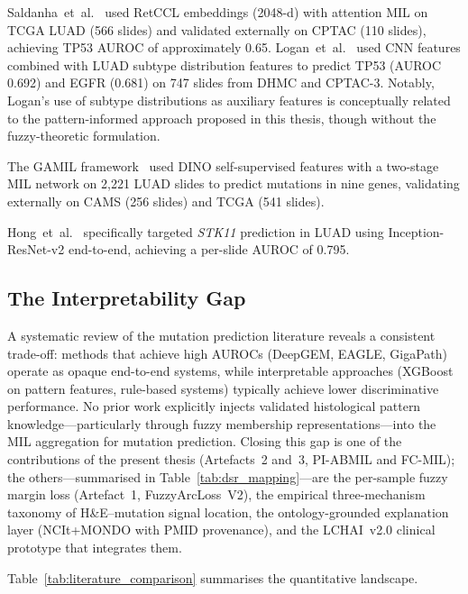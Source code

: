 Saldanha~et~al.~\cite{saldanha2023npj} used RetCCL embeddings (2048-d) with attention MIL on TCGA LUAD (566 slides) and validated externally on CPTAC (110 slides), achieving TP53 AUROC of approximately 0.65.
Logan~et~al.~\cite{logan2022medrxiv} used CNN features combined with LUAD subtype distribution features to predict TP53 (AUROC 0.692) and EGFR (0.681) on 747 slides from DHMC and CPTAC-3.
Notably, Logan's use of subtype distributions as auxiliary features is conceptually related to the pattern-informed approach proposed in this thesis, though without the fuzzy-theoretic formulation.

The GAMIL framework~\cite{gamil2025diagpath} used DINO self-supervised features with a two-stage MIL network on 2,221 LUAD slides to predict mutations in nine genes, validating externally on CAMS (256 slides) and TCGA (541 slides).

Hong~et~al.~\cite{hong2022stk11biomedinf} specifically targeted \textit{STK11} prediction in LUAD using Inception-ResNet-v2 end-to-end, achieving a per-slide AUROC of 0.795.

\subsection{The Interpretability Gap}
\label{sec:bg:related:gap}

A systematic review of the mutation prediction literature reveals a consistent trade-off: methods that achieve high AUROCs (DeepGEM, EAGLE, GigaPath) operate as opaque end-to-end systems, while interpretable approaches (XGBoost on pattern features, rule-based systems) typically achieve lower discriminative performance.
No prior work explicitly injects validated histological pattern knowledge---particularly through fuzzy membership representations---into the MIL aggregation for mutation prediction.
Closing this gap is one of the contributions of the present thesis (Artefacts~2 and~3, PI-ABMIL and FC-MIL); the others---summarised in Table~\ref{tab:dsr_mapping}---are the per-sample fuzzy margin loss (Artefact~1, FuzzyArcLoss~V2), the empirical three-mechanism taxonomy of H\&E--mutation signal location, the ontology-grounded explanation layer (NCIt+MONDO with PMID provenance), and the LCHAI~v2.0 clinical prototype that integrates them.

Table~\ref{tab:literature_comparison} summarises the quantitative landscape.

